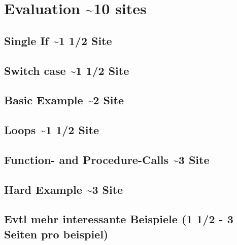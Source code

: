 
\chapter {Evaluation \textasciitilde 10 sites}
\label {cha:evaluation}

\section{Single If \textasciitilde 1 1/2 Site}
\section{Switch case \textasciitilde 1 1/2 Site}
\section{Basic Example \textasciitilde 2 Site}
\section{Loops \textasciitilde 1 1/2 Site}
\section{Function- and Procedure-Calls \textasciitilde 3 Site}
\section{Hard Example \textasciitilde 3 Site}
\section{Evtl mehr interessante Beispiele (1 1/2 - 3 Seiten pro beispiel)}